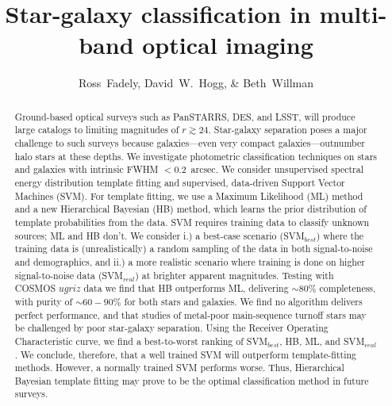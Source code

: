 \documentclass[12pt,preprint]{aastex}
\begin{document}
\title{Star-galaxy classification in multi-band optical imaging}
\author{Ross~Fadely,
        David~W.~Hogg,
        \& Beth~Willman}


%
%
\begin{abstract}
  Ground-based optical surveys such as PanSTARRS, DES, and LSST, will
  produce large catalogs to limiting magnitudes of $r \gtrsim 24$.
  Star-galaxy separation poses a major challenge to such surveys
  because galaxies---even very compact galaxies---outnumber halo stars
  at these depths.  We investigate photometric classification
  techniques on stars and galaxies with intrinsic FWHM $<0.2$~arcsec.
  We consider unsupervised spectral energy distribution template
  fitting and supervised, data-driven Support Vector Machines (SVM).
  For template fitting, we use a Maximum Likelihood (ML) method and a
  new Hierarchical Bayesian (HB) method, which learns the prior
  distribution of template probabilities from the data.  SVM requires training 
  data to classify unknown sources; ML and HB don't.  We consider i.) a
  best-case scenario (SVM$_{best}$) where the training data is
  (unrealistically) a random sampling of the data in both
  signal-to-noise and demographics, and ii.) a more realistic scenario
  where training is done on higher signal-to-noise data
  (SVM$_{real}$) at brighter apparent magnitudes.  Testing with COSMOS
  $ugriz$ data we find that HB outperforms ML, delivering $\sim80\%$
  completeness, with purity of $\sim60-90\%$ for both stars and galaxies.  
  We find no algorithm delivers perfect performance, and 
  that studies of metal-poor main-sequence turnoff stars
  may be challenged by poor star-galaxy separation.  Using the Receiver Operating 
  Characteristic curve, we find a best-to-worst ranking of SVM$_{best}$, HB, ML, and 
  SVM$_{real}$.  We conclude, therefore, that a well trained SVM will outperform 
  template-fitting methods.  However, a normally trained SVM performs worse.  Thus, 
  Hierarchical Bayesian template fitting may prove to be the optimal classification method 
  in future surveys.  
\end{abstract}
\end{document}
